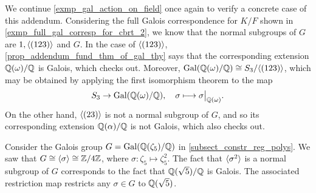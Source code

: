 \begin{example}
    We continue \cref{exmp_gal_action_on_field} once again to verify a concrete case of this addendum. Considering the full Galois correspondence for $K/F$ shown in \cref{exmp_full_gal_corresp_for_cbrt_2}, we know that the normal subgroups of $G$ are $1, \langle {(123)} \rangle$ and $G$. In the case of $\langle {(123)} \rangle$, \cref{prop_addendum_fund_thm_of_gal_thy} says that the corresponding extension $\mathbb{{Q}}(\omega)/\mathbb{{Q}}$ is Galois, which checks out. Moreover, $\operatorname{Gal}(\mathbb{{Q}}(\omega)/\mathbb{{Q}}) \cong S_3/\langle {(123)} \rangle$, which may be obtained by applying the first isomorphism theorem to the map
    \[
        S_3 \to \gal(\bb{Q}(\omega)/\bb{Q}), \quad \sigma \longmapsto \restr{\sigma}{\bb{Q}(\omega)}.
    \]
    On the other hand, $\langle {(23)} \rangle$ is not a normal subgroup of $G$, and so its corresponding extension $\mathbb{{Q}}(\alpha)/\mathbb{{Q}}$ is not Galois, which also checks out.
\end{example}

\begin{example}
    Consider the Galois group $G = \operatorname{Gal}(\mathbb{{Q}}(\zeta_5)/\mathbb{{Q}})$ in \cref{subsect_constr_reg_polys}. We saw that $G \cong \langle {\sigma} \rangle \cong \mathbb{{Z}}/{{4}}\mathbb{{Z}}$, where $\sigma: \zeta_5 \mapsto \zeta_5^2$. The fact that $\langle {\sigma^2} \rangle$ is a normal subgroup of $G$ corresponds to the fact that $\mathbb{{Q}}(\sqrt{5})/\mathbb{{Q}}$ is Galois. The associated restriction map restricts any $\sigma \in G$ to $\mathbb{{Q}}(\sqrt{5})$.
\end{example}
